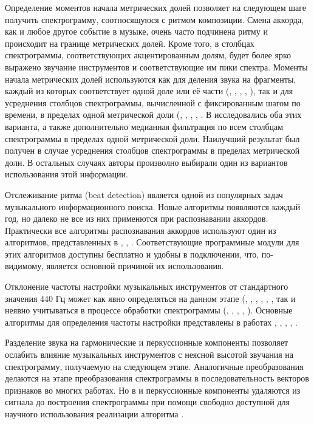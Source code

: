 Определение моментов начала метрических долей позволяет на следующем шаге
получить спектрограмму, соотносящуюся с ритмом композиции. Смена аккорда, как и
любое другое событие в музыке, очень часто подчинена ритму и происходит на
границе метрических долей. Кроме того, в столбцах спектрограммы, соответствующих
акцентированным долям, будет более ярко выражено звучание инструментов и
соответствующие им пики спектра. Моменты начала метрических долей используются
как для деления звука на фрагменты, каждый из которых соответствует одной доле
или её части (\cite{Yoshioka2004}, \cite{Sumi2008}, \cite{Weller2009},
\cite{Mcvicar2011}, \cite{Ni2011}), так и для усреднения столбцов спектрограммы,
вычисленной с фиксированным шагом по времени, в пределах одной метрической доли
(\cite{Bello2005}, \cite{Mauch2009}, \cite{Mauch2010}, \cite{DeHaas2012},
\cite{Chen2012}. В \cite{Chen2012} исследовались оба этих варианта, а также
дополнительно медианная фильтрация по всем столбцам спектрограммы в пределах
одной метрической доли. Наилучший результат был получен в случае усреднения
столбцов спектрограммы в пределах метрической доли. В остальных случаях авторы
произволно выбирали один из вариантов использования этой информации.

Отслеживание ритма (beat detection) является одной из популярных задач
музыкального информационного поиска. Новые алгоритмы появляются каждый год, но
далеко не все из них применются при распознавании аккордов. Практически все
алгоритмы распознавания аккордов используют один из алгоритмов, представленных в
\cite{Davies2007}, \cite{Dixon2007}, \cite{Ellis2007}. Соответствующие
программные модули для этих алгоритмов доступны бесплатно и удобны в
подключении, что, по-видимому, является основной причиной их использования.

Отклонение частоты настройки музыкальных инструментов от стандартного значения
440 Гц может как явно определяться на данном этапе (\cite{Gomez2006},
\cite{Papadopoulos2007}, \cite{Khadkevich2009}, \cite{Khadkevich2011},
\cite{Ni2011}, \cite{Jiang2011}, так и неявно учитываться в процессе обработки
спектрограммы (\cite{Bello2005}, \cite{Lee2006}, \cite{Reed2009},
\cite{Mauch2010}, \cite{Rocher2010}). Основные алгоритмы для определения частоты
настройки представлены в работах \cite{Harte2005}, \cite{Zhu2005},
\cite{Gomez2006}, \cite{Peeters2006}, \cite{KhadkevichPhase2009}.

Разделение звука на гармонические и перкуссионные компоненты позволяет ослабить
влияние музыкальных инструментов с неясной высотой звучания на спектрограмму,
получаемую на следующем этапе. Аналогичные преобразования делаются на этапе
преобразования спектрограммы в последовательность векторов признаков во многих
работах. Но в \cite{Reed2009} и \cite{Ni2011} перкуссионные компоненты удаляются
из сигнала до построения спектрограммы при помощи свободно доступной для
научного использования реализации алгоритма \cite{Ono2008}.

